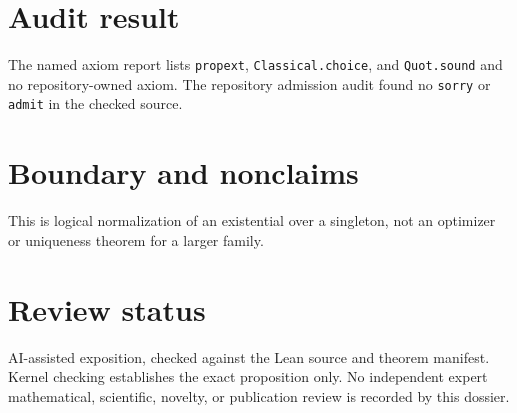 \documentclass[11pt]{article}
\begin{document}
\section{Audit result}
The named axiom report lists \texttt{propext}, \texttt{Classical.choice}, and
\texttt{Quot.sound} and no repository-owned axiom.  The repository admission audit found no
\texttt{sorry} or \texttt{admit} in the checked source.

\section{Boundary and nonclaims}
This is logical normalization of an existential over a singleton, not an optimizer or uniqueness theorem for a larger family.

\section{Review status}
AI-assisted exposition, checked against the Lean source and theorem manifest.  Kernel checking
establishes the exact proposition only.  No independent expert mathematical, scientific,
novelty, or publication review is recorded by this dossier.
\end{document}
